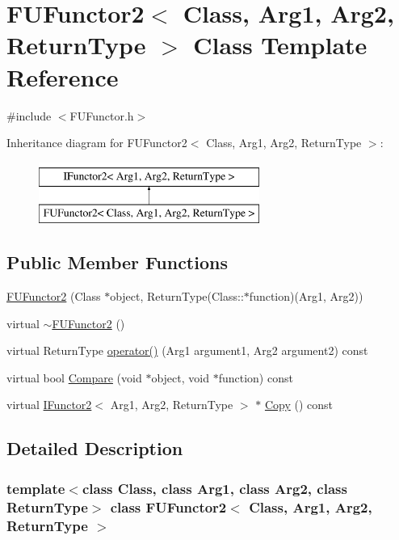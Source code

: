 \hypertarget{classFUFunctor2}{
\section{FUFunctor2$<$ Class, Arg1, Arg2, ReturnType $>$ Class Template Reference}
\label{classFUFunctor2}
}


{\ttfamily \#include $<$FUFunctor.h$>$}

Inheritance diagram for FUFunctor2$<$ Class, Arg1, Arg2, ReturnType $>$:\begin{figure}[H]
\begin{center}
\leavevmode
\includegraphics[height=2.000000cm]{classFUFunctor2}
\end{center}
\end{figure}
\subsection*{Public Member Functions}
\begin{DoxyCompactItemize}
\item 
\hyperlink{classFUFunctor2_ac7844391d3ba9c695d37474f559e743b}{FUFunctor2} (Class $\ast$object, ReturnType(Class::$\ast$function)(Arg1, Arg2))
\item 
virtual \hyperlink{classFUFunctor2_a00b84a67e792780b280ce726ed335d5c}{$\sim$FUFunctor2} ()
\item 
virtual ReturnType \hyperlink{classFUFunctor2_ac601e3c1fe7e07ee1136adcf0cce6cec}{operator()} (Arg1 argument1, Arg2 argument2) const 
\item 
virtual bool \hyperlink{classFUFunctor2_ab8147e03fb494870eddf4e1e92dcdaad}{Compare} (void $\ast$object, void $\ast$function) const 
\item 
virtual \hyperlink{classIFunctor2}{IFunctor2}$<$ Arg1, Arg2, ReturnType $>$ $\ast$ \hyperlink{classFUFunctor2_a46ede0cb306d5364c777de1f66d06bc5}{Copy} () const 
\end{DoxyCompactItemize}


\subsection{Detailed Description}
\subsubsection*{template$<$class Class, class Arg1, class Arg2, class ReturnType$>$ class FUFunctor2$<$ Class, Arg1, Arg2, ReturnType $>$}

